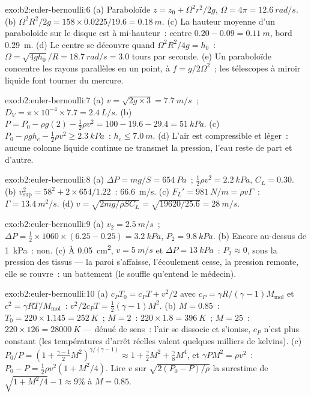 \begin{solution}{exo:b2:euler-bernoulli:6}
(a) Paraboloïde $z = z_0 + \Omega^2r^2/2g$, $\Omega = 4\pi = \qty{12.6}{rad/s}$. (b)
$\Omega^2R^2/2g = 158 \times 0.0225/19.6 = \qty{0.18}{m}$. (c) La hauteur moyenne d'un
paraboloïde sur le disque est à mi-hauteur~: centre $0.20 - 0.09 = \qty{0.11}{m}$, bord
\qty{0.29}{m}. (d) Le centre se découvre quand $\Omega^2R^2/4g = h_0$~: $\Omega = \sqrt{4gh_0}/R =
\qty{18.7}{rad/s} = 3.0$ tours par seconde. (e) Un paraboloïde concentre
les rayons parallèles en un point, à $f = g/2\Omega^2$~; les télescopes à miroir liquide
font tourner du mercure.
\end{solution}

\begin{solution}{exo:b2:euler-bernoulli:7}
(a) $v = \sqrt{2g \times 3} = \qty{7.7}{m/s}$~; $D_V = \pi \times 10^{-4} \times 7.7 =
\qty{2.4}{L/s}$. (b) $P = P_0 - \rho g(2) - \tfrac12\rho v^2 = 100 - 19.6 - 29.4 =
\qty{51}{kPa}$. (c) $P_0 - \rho gh_c - \tfrac12\rho v^2 \ge \qty{2.3}{kPa}$~: $h_c \le
\qty{7.0}{m}$. (d) L'air est compressible et léger~: aucune colonne liquide
continue ne transmet la pression, l'eau reste de part et d'autre.
\end{solution}

\begin{solution}{exo:b2:euler-bernoulli:8}
(a) $\Delta P = mg/S = \qty{654}{Pa}$~; $\tfrac12\rho v^2 = \qty{2.2}{kPa}$, $C_L = 0.30$.
(b) $v_{\text{sup}}^2 = 58^2 + 2 \times 654/1.22$~: \qty{66.6}{m/s}. (c) $F_L' =
\qty{981}{N/m} = \rho v\Gamma$~: $\Gamma = \qty{13.4}{m^2/s}$. (d) $v = \sqrt{2mg/
\rho SC_L} = \sqrt{19620/25.6} = \qty{28}{m/s}$.
\end{solution}

\begin{solution}{exo:b2:euler-bernoulli:9}
(a) $v_2 = \qty{2.5}{m/s}$~; $\Delta P = \tfrac12 \times 1060 \times (6.25 - 0.25) =
\qty{3.2}{kPa}$, $P_2 = \qty{9.8}{kPa}$. (b) Encore au-dessus de \qty{1}{kPa}~: non. (c) À
\qty{0.05}{cm^2}, $v = \qty{5}{m/s}$ et $\Delta P = \qty{13}{kPa}$~: $P_2 \approx 0$, sous
la pression des tissus --- la paroi s'affaisse, l'écoulement cesse, la
pression remonte, elle se rouvre~: un battement (le souffle qu'entend le médecin).
\end{solution}

\begin{solution}{exo:b2:euler-bernoulli:10}
(a) $c_PT_0 = c_PT + v^2/2$ avec $c_P = \gamma R/(\gamma - 1)M_{\text{mol}}$ et
$c^2 = \gamma RT/M_{\text{mol}}$~: $v^2/2c_PT = \tfrac12(\gamma - 1)M^2$. (b) $M =
0.85$~: $T_0 = 220 \times 1.145 = \qty{252}{K}$~; $M = 2$~: $220 \times 1.8 = \qty{396}{K}$~;
$M = 25$~: $220 \times 126 = \qty{28000}{K}$ --- dénué de sens~: l'air se dissocie
et s'ionise, $c_P$ n'est plus constant (les températures d'arrêt réelles valent
quelques milliers de kelvins). (c) $P_0/P = (1 + \tfrac{\gamma - 1}2M^2)^{\gamma/(\gamma
- 1)} \approx 1 + \tfrac{\gamma}2M^2 + \tfrac{\gamma}8M^4$, et $\gamma PM^2 = \rho v^2$~:
$P_0 - P = \tfrac12\rho v^2(1 + M^2/4)$. Lire $v$ sur $\sqrt{2(P_0 - P)/\rho}$
la surestime de $\sqrt{1 + M^2/4} - 1 \approx 9\%$ à $M = 0.85$.
\end{solution}

